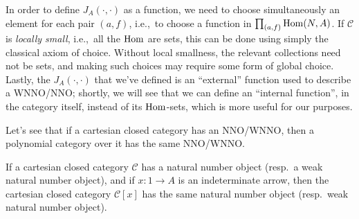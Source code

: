 \begin{notation}
    In order to define $J_A(\cdot,\cdot)$ as a function, we need to choose simultaneously an element for each pair $(a,f)$, i.e.,\ to choose a function in $\prod_{(a,f)} \operatorname{Hom}(N,A)$.
    If $\mathcal C$ is \emph{locally small}, i.e.,\ all the $\operatorname{Hom}$ are sets, this can be done using simply the classical axiom of choice. Without local smallness,
    the relevant collections need not be sets, and making such choices may require some form of global choice.\newline
    Lastly, the $J_A(\cdot,\cdot)$ that we've defined is an “external” function used to describe a WNNO/NNO; shortly, we will see that we can define an “internal function”,
    in the category itself, instead of its $\operatorname{Hom}$-sets, which is more useful for our purposes.
\end{notation}

Let's see that if a cartesian closed category has an NNO/WNNO, then a polynomial category over it has the same NNO/WNNO.

\begin{proposition}
    If a cartesian closed category $\mathcal{C}$ has a natural number object (resp.\ a weak natural number object), and if $x : 1 \to A$
    is an indeterminate arrow, then the cartesian closed category $\mathcal{C}[x]$ has the same natural number object (resp.\ weak natural number object).
\end{proposition}

